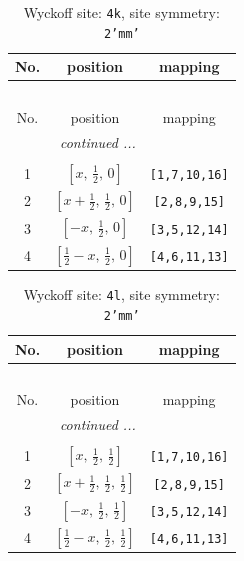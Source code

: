 \documentclass[fleqn,8pt]{jsarticle}
\begin{document}
\renewcommand{\arraystretch}{1.2}
\begin{longtable}{ccc}
\caption{Wyckoff site: {\tt 4k}, site symmetry: {\tt 2'mm'}}
 \\
 \hline \hline
No. & position & mapping \\ \hline \endfirsthead

\multicolumn{2}{l}{\tablename\ \thetable{}} \\
 \hline \hline
No. & position & mapping \\ \hline \endhead

 \hline \hline
\multicolumn{2}{r}{\footnotesize\it continued ...} \\ \endfoot

 \hline \hline
\multicolumn{2}{r}{} \\ \endlastfoot

1 & $\left[ x,\, \frac{1}{2},\, 0 \right]$ & {\tt [1,7,10,16]} \\ \hline
2 & $\left[ x + \frac{1}{2},\, \frac{1}{2},\, 0 \right]$ & {\tt [2,8,9,15]} \\ \hline
3 & $\left[ - x,\, \frac{1}{2},\, 0 \right]$ & {\tt [3,5,12,14]} \\ \hline
4 & $\left[ \frac{1}{2} - x,\, \frac{1}{2},\, 0 \right]$ & {\tt [4,6,11,13]} \\
\end{longtable}
\renewcommand{\arraystretch}{1.2}
\begin{longtable}{ccc}
\caption{Wyckoff site: {\tt 4l}, site symmetry: {\tt 2'mm'}}
 \\
 \hline \hline
No. & position & mapping \\ \hline \endfirsthead

\multicolumn{2}{l}{\tablename\ \thetable{}} \\
 \hline \hline
No. & position & mapping \\ \hline \endhead

 \hline \hline
\multicolumn{2}{r}{\footnotesize\it continued ...} \\ \endfoot

 \hline \hline
\multicolumn{2}{r}{} \\ \endlastfoot

1 & $\left[ x,\, \frac{1}{2},\, \frac{1}{2} \right]$ & {\tt [1,7,10,16]} \\ \hline
2 & $\left[ x + \frac{1}{2},\, \frac{1}{2},\, \frac{1}{2} \right]$ & {\tt [2,8,9,15]} \\ \hline
3 & $\left[ - x,\, \frac{1}{2},\, \frac{1}{2} \right]$ & {\tt [3,5,12,14]} \\ \hline
4 & $\left[ \frac{1}{2} - x,\, \frac{1}{2},\, \frac{1}{2} \right]$ & {\tt [4,6,11,13]} \\
\end{longtable}
\end{document}
